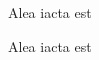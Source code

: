 \thispagestyle{empty}

\vspace*{3cm}

\begin{center}
Alea iacta est
\end{center}

\medskip

\begin{center}
Alea iacta est
\end{center}
